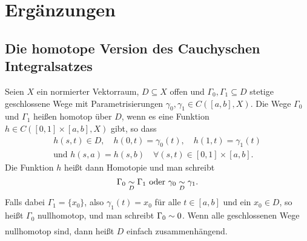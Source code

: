 \documentclass[a4paper,twoside,DIV15,BCOR12mm]{scrbook}
\begin{document}

\chapter{Ergänzungen}
\section{Die homotope Version des Cauchyschen Integralsatzes}

\begin{dfn}\label{dfn4.1}
Seien $X$ ein normierter Vektorraum, $D\subseteq X$ offen und $\Gamma_0,\Gamma_1\subseteq D$ stetige geschlossene Wege mit Parametrisierungen $\gamma_0,\gamma_1\in C([a,b],X)$. Die Wege $\Gamma_0$ und $\Gamma_1$ heißen homotop über $D$, wenn es eine Funktion $h\in C([0,1]\times[a,b],X)$ gibt, so dass
\begin{gather*}
h(s,t)\in D,\quad h(0,t)=\gamma_0(t),\quad h(1,t)=\gamma_1(t)\\
\text{und }h(s,a) = h(s,b)\quad\forall(s,t)\in[0,1]\times[a,b].
\end{gather*}
Die Funktion $h$ heißt dann Homotopie und man schreibt
\[\Gamma_0\underset{D}{\sim}\Gamma_1\text{ oder }\gamma_0\underset{D}{\sim}\gamma_1.\]
Falls dabei $\Gamma_1=\{x_0\}$, also $\gamma_1(t)=x_0$ für alle $t\in[a,b]$ und ein $x_0\in D$, so heißt $\Gamma_0$ nullhomotop, und man schreibt $\Gamma_0\underset{}{\sim}0$. Wenn alle geschlossenen Wege nullhomotop sind, dann heißt $D$ einfach zusammenhängend.
\end{dfn}
\end{document}
